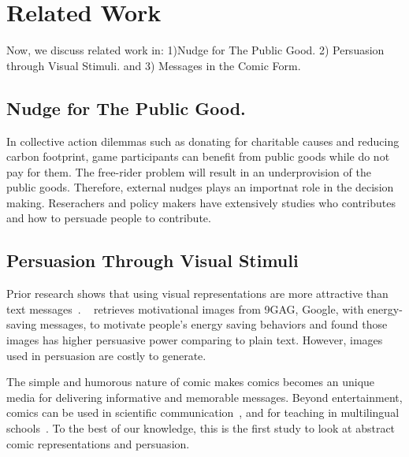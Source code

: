 \section{Related Work}
\label{sec:relatedwork}
Now, we discuss related work in: 1)Nudge for The Public Good. 2) Persuasion through Visual Stimuli. and 3) Messages in the Comic Form.

\subsection{Nudge for The Public Good.}
In collective action dilemmas such as donating for charitable causes and reducing carbon footprint, game participants can benefit from public goods while do not pay for them. The free-rider problem will result in an underprovision of the public goods. Therefore, external nudges plays an importnat role in the decision making. Reserachers and policy makers have extensively studies who contributes and how to persuade people to contribute.  


\subsection{Persuasion Through Visual Stimuli}
Prior research shows that using visual representations are more attractive than text messages~\cite{selker2015sweetbuildinggreeter,consolvo2008activity}. ~\textcite{selker2015sweetbuildinggreeter} retrieves motivational images from 9GAG, Google, with energy-saving messages, to motivate people's energy saving behaviors and found those images has higher persuasive power comparing to plain text. However, images used in persuasion are costly to generate. 

The simple and humorous nature of comic makes comics becomes an unique media for delivering informative and memorable messages. Beyond entertainment, comics can be used in scientific communication~\cite{McDermottPB18}, and for teaching in multilingual schools~\cite{cary2004going}. To the best of our knowledge, this is the first study to look at abstract comic representations and persuasion.

